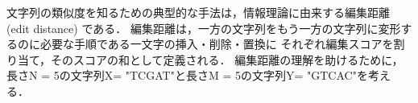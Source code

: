 文字列の類似度を知るための典型的な手法は，情報理論に由来する編集距離 (edit distance) である．
編集距離は，一方の文字列をもう一方の文字列に変形するのに必要な手順である一文字の挿入・削除・置換に
それぞれ編集スコアを割り当て，そのスコアの和として定義される．
編集距離の理解を助けるために，長さN = 5の文字列X= "TCGAT"と長さM = 5の文字列Y= "GTCAC"を考える．
\begin{figure}[t!]
\begin{center}
\\
\\
\subfigure[]{
}
\end{center}
\end{figure}
